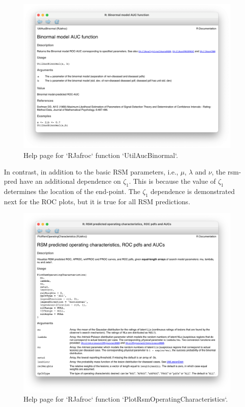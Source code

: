 \documentclass[
]{book}
\begin{document}
\begin{figure}

{\centering \includegraphics{images/rsm-pred/util-aucs-binormal} 

}

\caption{Help page for `RJafroc` function `UtilAucBinormal`.}\label{fig:rsm-pred-binorml-help}
\end{figure}

In contrast, in addition to the basic RSM parameters, i.e., \(\mu\), \(\lambda\) and \(\nu\), the rsm-pred have an additional dependence on \(\zeta_1\). This is because the value of \(\zeta_1\) determines the location of the end-point. The \(\zeta_1\) dependence is demonstrated next for the ROC plots, but it is true for all RSM predictions.

\begin{figure}

{\centering \includegraphics{images/rsm-pred/PlotRsmOperatingCharacteristics} 

}

\caption{Help page for `RJafroc` function `PlotRsmOperatingCharacteristics`.}\label{fig:rsm-pred-operating-characteristics-help}
\end{figure}
\end{document}
